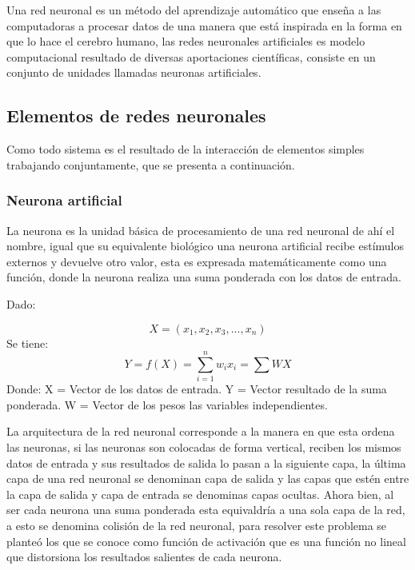 \documentclass[
  12pt,
]{article}
\begin{document}
Una red neuronal es un método del aprendizaje automático que enseña a
las computadoras a procesar datos de una manera que está inspirada en la
forma en que lo hace el cerebro humano, las redes neuronales
artificiales es modelo computacional resultado de diversas aportaciones
científicas, consiste en un conjunto de unidades llamadas neuronas
artificiales.

\hypertarget{elementos-de-redes-neuronales}{%
\subsection{Elementos de redes
neuronales}\label{elementos-de-redes-neuronales}}

Como todo sistema es el resultado de la interacción de elementos simples
trabajando conjuntamente, que se presenta a continuación.

\hypertarget{neurona-artificial}{%
\subsubsection{Neurona artificial}\label{neurona-artificial}}

La neurona es la unidad básica de procesamiento de una red neuronal de
ahí el nombre, igual que su equivalente biológico una neurona artificial
recibe estímulos externos y devuelve otro valor, esta es expresada
matemáticamente como una función, donde la neurona realiza una suma
ponderada con los datos de entrada.

Dado:

\[ X = \left( x_{1},x_{2},x_{3},...,x_{n} \right) \] Se tiene:
\[ Y = f(X) = \sum_{i=1}^{n}{w_{i}x_{i}}  = \sum{WX}  \] Donde: \newline
X = Vector de los datos de entrada. \newline Y = Vector resultado de la
suma ponderada. \newline W = Vector de los pesos las variables
independientes.

La arquitectura de la red neuronal corresponde a la manera en que esta
ordena las neuronas, si las neuronas son colocadas de forma vertical,
reciben los mismos datos de entrada y sus resultados de salida lo pasan
a la siguiente capa, la última capa de una red neuronal se denominan
capa de salida y las capas que estén entre la capa de salida y capa de
entrada se denominas capas ocultas. Ahora bien, al ser cada neurona una
suma ponderada esta equivaldría a una sola capa de la red, a esto se
denomina colisión de la red neuronal, para resolver este problema se
planteó los que se conoce como función de activación que es una función
no lineal que distorsiona los resultados salientes de cada neurona.
\end{document}
